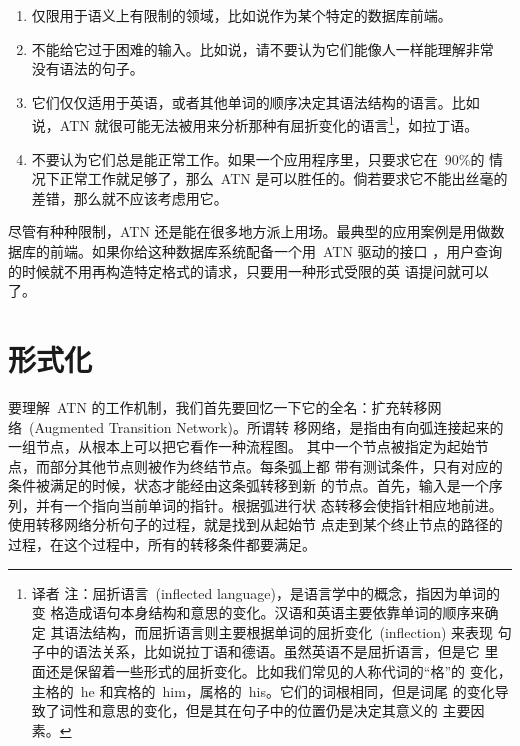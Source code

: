 \begin{enumerate}
\item 仅限用于语义上有限制的领域，比如说作为某个特定的数据库前端。

\item 不能给它过于困难的输入。比如说，请不要认为它们能像人一样能理解非常
  没有语法的句子。

\item 它们仅仅适用于英语，或者其他单词的顺序决定其语法结构的语言。比如
  说，\textsc{ATN} 就很可能无法被用来分析那种有屈折变化的语言\footnote{译者
    注：屈折语言~(inflected language)，是语言学中的概念，指因为单词的变
    格造成语句本身结构和意思的变化。汉语和英语主要依靠单词的顺序来确定
    其语法结构，而屈折语言则主要根据单词的屈折变化~(inflection) 来表现
    句子中的语法关系，比如说拉丁语和德语。虽然英语不是屈折语言，但是它
    里面还是保留着一些形式的屈折变化。比如我们常见的人称代词的``格''的
    变化，主格的~he 和宾格的~him，属格的~his。它们的词根相同，但是词尾
    的变化导致了词性和意思的变化，但是其在句子中的位置仍是决定其意义的
    主要因素。}，如拉丁语。

\item 不要认为它们总是能正常工作。如果一个应用程序里，只要求它在~90\%的
  情况下正常工作就足够了，那么~\textsc{ATN} 是可以胜任的。倘若要求它不能出丝毫的
  差错，那么就不应该考虑用它。

\end{enumerate}
 
尽管有种种限制，\textsc{ATN} 还是能在很多地方派上用场。最典型的应用案例是用做数
据库的前端。如果你给这种数据库系统配备一个用~\textsc{ATN} 驱动的接口
，用户查询的时候就不用再构造特定格式的请求，只要用一种形式受限的英
语提问就可以了。

\section{形式化}
\label{sec:the_formalism}

要理解~\textsc{ATN} 的工作机制，我们首先要回忆一下它的全名：扩充转移网络~(Augmented Transition Network)。所谓转
移网络，是指由有向弧连接起来的一组节点，从根本上可以把它看作一种流程图。
其中一个节点被指定为起始节点，而部分其他节点则被作为终结节点。每条弧上都
带有测试条件，只有对应的条件被满足的时候，状态才能经由这条弧转移到新
的节点。首先，输入是一个序列，并有一个指向当前单词的指针。根据弧进行状
态转移会使指针相应地前进。使用转移网络分析句子的过程，就是找到从起始节
点走到某个终止节点的路径的过程，在这个过程中，所有的转移条件都要满足。

